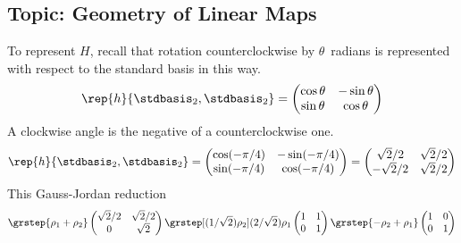 \subsection{Topic: Geometry of Linear Maps}
\begin{ans}{1}
      \begin{exparts}
        \partsitem  To represent $H$, recall that rotation counterclockwise by
          $\theta$~radians is represented with respect to the standard basis
          in this way.
          \begin{equation*}
            \rep{h}{\stdbasis_2,\stdbasis_2}
            =\begin{pmatrix}
              \cos\theta  &-\sin\theta  \\
              \sin\theta  &\cos\theta
             \end{pmatrix}
          \end{equation*}
          A clockwise angle is the negative of a counterclockwise
          one.
          \begin{equation*}
            \rep{h}{\stdbasis_2,\stdbasis_2}
            =\begin{pmatrix}
              \cos(-\pi/4)  &-\sin(-\pi/4)  \\
              \sin(-\pi/4)  &\cos(-\pi/4)
            \end{pmatrix}
            =\begin{pmatrix}
              \sqrt{2}/2  &\sqrt{2}/2  \\
              -\sqrt{2}/2 &\sqrt{2}/2
            \end{pmatrix}
          \end{equation*}
          This Gauss-Jordan reduction
          \begin{equation*}
            \grstep{\rho_1+\rho_2}
            \begin{pmatrix}
              \sqrt{2}/2  &\sqrt{2}/2  \\
              0           &\sqrt{2}
            \end{pmatrix}
            \grstep[(1/\sqrt{2})\rho_2]{(2/\sqrt{2})\rho_1}
            \begin{pmatrix}
              1  &1  \\
              0  &1
            \end{pmatrix}
            \grstep{-\rho_2+\rho_1}
            \begin{pmatrix}
              1  &0  \\
              0  &1
            \end{pmatrix}

\end{equation*}
\end{exparts}
\end{ans}
